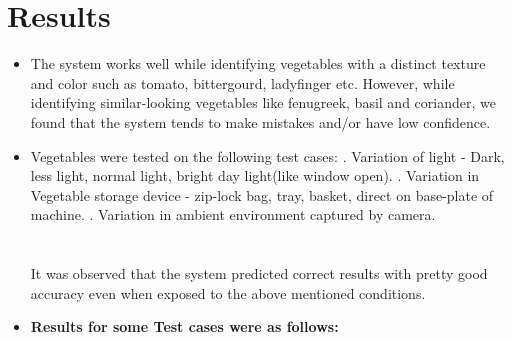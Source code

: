 \documentclass[a4paper,12pt,oneside]{book}
\begin{document}
\section{Results}

\begin{itemize}
	\item The system works well while identifying vegetables with a distinct texture and color such as tomato, bittergourd, ladyfinger etc. However, while identifying similar-looking vegetables like fenugreek, basil and coriander, we found that the system tends to make mistakes and/or have low confidence.
	\item Vegetables were tested on the following test cases:
	. Variation of light - Dark, less light, normal light, bright day light(like window open).
	. Variation in Vegetable storage device - zip-lock bag, tray, basket, direct on base-plate of machine.
	. Variation in ambient environment captured by camera.\\\\\\	
	  It was observed that the system predicted correct results with pretty good accuracy even when exposed to the above mentioned conditions.
	  \newpage
	  \item \Large\textbf{Results for some Test cases were as follows:}
	  

\end{itemize}
\end{document}

